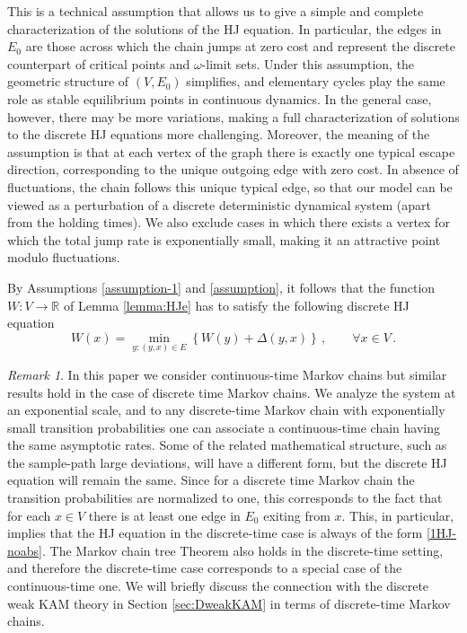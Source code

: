\documentclass[reqno]{amsart}
\theoremstyle{plain}
\theoremstyle{definition}
\theoremstyle{remark}
\newtheorem{remark}[theorem]{Remark}
\numberwithin{equation}{section}
\numberwithin{theorem}{section}
\newcommand{\<}{\langle}
\renewcommand{\>}{\rangle}
\begin{document}
This is a technical assumption that allows us to give a simple and complete characterization of the solutions of the HJ equation. In particular, the edges in $E_0$ are those across which the chain jumps at zero cost and represent the discrete counterpart of critical points and $\omega$-limit sets. Under this assumption, the geometric structure of $(V,E_0)$ simplifies, and elementary cycles play the same role as stable equilibrium points in continuous dynamics.
In the general case, however, there may be  more variations, making a full characterization of solutions to the discrete HJ equations more challenging. Moreover, the meaning of the assumption is that at each vertex of the graph there is exactly one typical escape direction, corresponding to the unique outgoing edge with zero cost. In absence of fluctuations, the chain follows this unique typical edge, so that our model can be viewed as a perturbation of a discrete deterministic dynamical system (apart from the holding times). We  also exclude cases in which there exists a vertex for which the total jump rate is exponentially small, making it  an attractive point modulo fluctuations.


By Assumptions \ref{assumption-1} and \ref{assumption},  it follows that the function $W:V\to \mathbb R$ of Lemma \ref{lemma:HJe} has to satisfy the following discrete HJ equation 
\begin{equation}\label{1HJ-noabs}
	W(x)=\min_{y:(y,x)\in E}\left\{W(y)+\Delta(y,x)\right\}\,,\qquad \forall x\in V\,.
\end{equation}


\begin{remark}\label{discreteMC}
In this paper we consider continuous-time Markov chains but similar results hold in the case of discrete time Markov chains. We analyze the system at an exponential scale, and to any discrete-time Markov chain with exponentially small transition probabilities one can associate a continuous-time chain having the same asymptotic rates. Some of the related mathematical structure, such as the sample-path large deviations, will have a different form, but the discrete HJ equation will remain the same. Since for a discrete time Markov chain the transition probabilities are normalized to one, this corresponds to the fact that for each $x\in V$ there is at least one edge in $E_0$ exiting from $x$. This, in particular, implies that the HJ equation in the discrete-time case is always of the form \eqref{1HJ-noabs}. The Markov chain tree Theorem also holds in the discrete-time setting, and therefore the discrete-time case corresponds to a special case of the continuous-time one. We will briefly discuss the connection with the discrete weak KAM theory in Section \ref{sec:DweakKAM} in terms of discrete-time Markov chains.
\end{remark}
\end{document}
